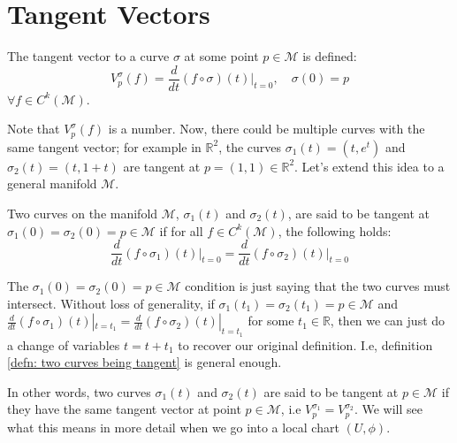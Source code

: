   \section{Tangent Vectors}
    \begin{definition}
      The tangent vector to a curve $\sigma$ at some point $p\in
      \mathcal{M}$ is defined:
      \begin{equation*}
        V^{\sigma}_{p}(f) = \frac{d}{dt}(f\circ\sigma)(t)\Bigr|_{t=0},
        \quad \sigma(0) = p
      \end{equation*}
      $\forall f \in C^k(\mathcal{M})$.
    \end{definition}
    Note that $V^{\sigma}_{p}(f)$ is a number. Now, there could be multiple
    curves with the same tangent vector; for example in $\mathbb{R}^2$, the
    curves $\sigma_1(t) = (t,e^t)$ and $\sigma_2(t) = (t, 1 + t)$ are
    tangent at $p = (1,1)\in \mathbb{R}^2$. Let's extend this idea to a
    general manifold $\mathcal{M}$.
    \begin{definition}
      \label{defn: two curves being tangent}
      Two curves on the manifold $\mathcal{M}$, $\sigma_1(t)$ and
      $\sigma_2(t)$, are said to be tangent at $\sigma_1(0) = \sigma_2(0) =
      p \in \mathcal{M}$ if for all $f \in C^k(\mathcal{M})$, the following
      holds:
      \begin{equation*}
        \frac{d}{dt}(f\circ \sigma_1)(t)\Bigr|_{t=0} = \frac{d}{dt}(f\circ
        \sigma_2)(t)\Bigr|_{t=0}
      \end{equation*}
    \end{definition}
    \begin{remark}
      The $\sigma_1(0) = \sigma_2(0) = p \in \mathcal{M}$ condition is just
      saying that the two curves must intersect. Without loss of
      generality, if $\sigma_1(t_1) = \sigma_2(t_1) = p \in \mathcal{M}$
      and $\frac{d}{dt}(f\circ \sigma_1)(t)|_{t=t_1} =
      \frac{d}{dt}(f\circ \sigma_2)(t)|_{t=t_1}$ for some $t_1\in
      \mathbb{R}$, then we can just do a change of variables $t = t + t_1$
      to recover our original definition. I.e, definition \ref{defn: two
      curves being tangent} is general enough.
    \end{remark}
    \begin{remark}
      In other words, two curves $\sigma_1(t)$ and $\sigma_2(t)$ are said
      to be tangent at $p\in \mathcal{M}$ if they have the same tangent
      vector at point $p\in \mathcal{M}$, i.e $V_p^{\sigma_1} =
      V_p^{\sigma_2}$. We will see what this means in more detail when we
      go into a local chart $(U,\phi)$.
    \end{remark}
